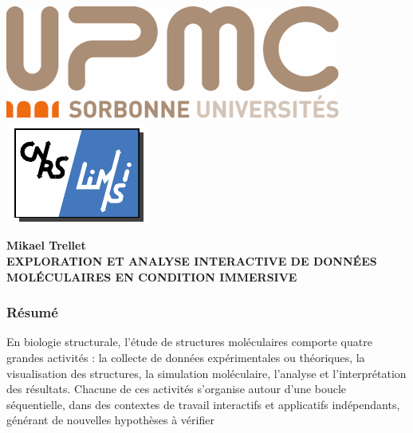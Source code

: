 \backmatter 
\chapter*{}%
\pagestyle{empty}

\setlength{\headheight}{0.pt}
        
\includegraphics[height=1.cm]{./figures/UPMC_these.pdf}\hfill
\includegraphics[height=1.cm]{./figures/limsilogo_vectoriel.pdf}\hfill


\begin{center}
 \textbf{Mikael Trellet} \\
 \textbf{EXPLORATION ET ANALYSE INTERACTIVE DE DONNÉES MOLÉCULAIRES EN CONDITION IMMERSIVE}
\end{center}
    

\footnotesize
\subsection*{Résumé}












\footnotesize
En biologie structurale, l'étude de structures moléculaires comporte quatre grandes activités : la collecte de données expérimentales ou théoriques, la visualisation des structures, la simulation moléculaire, l'analyse et l'interprétation des résultats. Chacune de ces activités s'organise autour d'une boucle séquentielle, dans des contextes de travail interactifs et applicatifs indépendants, générant de nouvelles hypothèses à vérifier 

